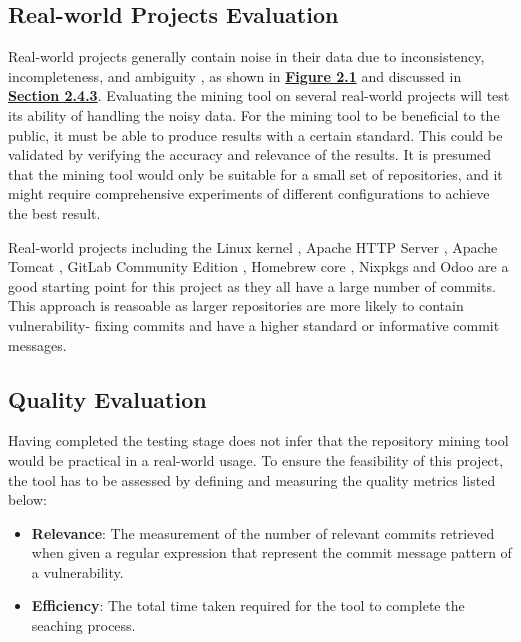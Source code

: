 \documentclass[12pt, a4paper]{report}
\begin{document}
\subsection{Real-world Projects Evaluation} \label{sec:realworld}
Real-world projects generally contain noise in their data due to inconsistency, incompleteness, and
ambiguity \cite{alqahtani_2016}, as shown in \hyperref[figure:comparion_vfc]{\textbf{Figure 2.1}}
and discussed in \hyperref[subsec:finding_vuln]{\textbf{Section 2.4.3}}. Evaluating the mining tool
on several real-world projects will test its ability of handling the noisy data. For the mining tool
to be beneficial to the public, it must be able to produce results with a certain standard. This
could be validated by verifying the accuracy and relevance of the results. It is presumed that the
mining tool would only be suitable for a small set of repositories, and it might require
comprehensive experiments of different configurations to achieve the best result.

Real-world projects including the Linux kernel \cite{linux_repo}, Apache HTTP Server
\cite{apache_httpd_repo}, Apache Tomcat \cite{apache_tomcat_repo}, GitLab Community Edition
\cite{gitlab_repo}, Homebrew core \cite{homebrew_core_repo}, Nixpkgs \cite{nix_packages_repo} and
Odoo \cite{odoo_repo} are a good starting point for this project as they all have a large number of
commits. This approach is reasoable as larger repositories are more likely to contain vulnerability-
fixing commits and have a higher standard or informative commit messages.

\subsection{Quality Evaluation}
Having completed the testing stage does not infer that the repository mining tool would be practical
in a real-world usage. To ensure the feasibility of this project, the tool has to be assessed by
defining and measuring the quality metrics listed below:

\begin{itemize}
	\item \textbf{Relevance}: The measurement of the number of relevant commits retrieved when given a
  regular expression that represent the commit message pattern of a vulnerability.
  \item \textbf{Efficiency}: The total time taken required for the tool to complete the seaching
  process.
\end{itemize}
\end{document}
